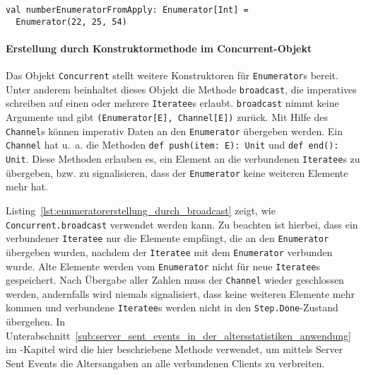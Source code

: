 \begin{lstlisting}[caption=Erstellung eines Enumerators durch die apply-Konstruktormethode, label=lst:enumeratorerstellung_durch_apply]
val numberEnumeratorFromApply: Enumerator[Int] =
  Enumerator(22, 25, 54)
\end{lstlisting}


\paragraph{Erstellung durch Konstruktormethode im Concurrent-Objekt} %
\label{par:erstellung_durch_konstruktormethode_im_concurrent_objekt}\mbox{} %

Das Objekt \lstinline|Concurrent| stellt weitere Konstruktoren für \lstinline|Enumerator|s bereit.
Unter anderem beinhaltet dieses Objekt die Methode \lstinline|broadcast|, die imperatives schreiben auf einen oder mehrere \lstinline|Iteratee|s erlaubt.
\lstinline|broadcast| nimmt keine Argumente und gibt \lstinline|(Enumerator[E], Channel[E])| zurück.
Mit Hilfe des \lstinline|Channel|s können imperativ Daten an den \lstinline|Enumerator| übergeben werden.
Ein \lstinline|Channel| hat u.~a. die Methoden \lstinline|def push(item: E): Unit| und \lstinline|def end(): Unit|.
Diese Methoden erlauben es, ein Element an die verbundenen \lstinline|Iteratee|s zu übergeben, bzw. zu signalisieren, dass der \lstinline|Enumerator| keine weiteren Elemente mehr hat.

Listing~\ref{lst:enumeratorerstellung_durch_broadcast} zeigt, wie \lstinline|Concurrent.broadcast| verwendet werden kann.
Zu beachten ist hierbei, dass ein verbundener \lstinline|Iteratee| nur die Elemente empfängt, die an den \lstinline|Enumerator| übergeben wurden, nachdem der \lstinline|Iteratee| mit dem \lstinline|Enumerator| verbunden wurde.
Alte Elemente werden vom \lstinline|Enumerator| nicht für neue \lstinline|Iteratee|s gespeichert.
Nach Übergabe aller Zahlen muss der \lstinline|Channel| wieder geschlossen werden, andernfalls wird niemals signalisiert, dass keine weiteren Elemente mehr kommen und verbundene \lstinline|Iteratee|s werden nicht in den \lstinline|Step.Done|-Zustand übergehen.
In Unterabschnitt~\ref{sub:server_sent_events_in_der_altersstatistiken_anwendung} im -Kapitel wird die hier beschriebene Methode verwendet, um mittels Server Sent Events die Altersangaben an alle verbundenen Clients zu verbreiten.

